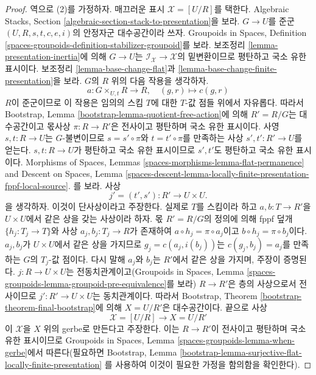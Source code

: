 \begin{proof}
\medskip\noindent
역으로 (2)를 가정하자. 매끄러운 표시 $\mathcal{X} = [U/R]$를 택한다.
Algebraic Stacks, Section
\ref{algebraic-section-stack-to-presentation}을 보라. $G \to U$를 준군
$(U, R, s, t, c, e, i)$의 안정자군 대수공간이라 쓰자. Groupoids in
Spaces, Definition \ref{spaces-groupoids-definition-stabilizer-groupoid}를
보라. 보조정리 \ref{lemma-presentation-inertia}에 의해 $G \to U$는
$\mathcal{I}_\mathcal{X} \to \mathcal{X}$의 밑변환이므로 평탄하고 국소
유한 표시이다. 보조정리 \ref{lemma-base-change-flat}과
\ref{lemma-base-change-finite-presentation}을 보라. $G$의 $R$ 위의 다음
작용을 생각하자.
$$
a : G \times_{U, t} R \to R, \quad (g, r) \mapsto c(g, r)
$$
$R$이 준군이므로 이 작용은 임의의 스킴 $T$에 대한 $T$-값 점들 위에서
자유롭다. 따라서 Bootstrap, Lemma
\ref{bootstrap-lemma-quotient-free-action}에 의해 $R' = R/G$는
대수공간이고 몫사상 $\pi : R \to R'$은 전사이고 평탄하며 국소 유한
표시이다. 사영 $s, t : R \to U$는 $G$-불변이므로
$s = s' \circ \pi$와 $t = t' \circ \pi$를 만족하는 사상
$s' , t' : R' \to U$를 얻는다. $s, t : R \to U$가 평탄하고 국소 유한
표시이므로 $s', t'$도 평탄하고 국소 유한 표시이다. Morphisms of Spaces,
Lemmas
\ref{spaces-morphisms-lemma-flat-permanence} and
Descent on Spaces, Lemma
\ref{spaces-descent-lemma-locally-finite-presentation-fppf-local-source}.
를 보라. 사상
$$
j' = (t', s') : R' \longrightarrow U \times U.
$$
을 생각하자. 이것이 단사상이라고 주장한다. 실제로 $T$를 스킴이라 하고
$a, b : T \to R'$을 $U \times U$에서 같은 상을 갖는 사상이라 하자.
몫 $R' = R/G$의 정의에 의해 fppf 덮개 $\{h_j : T_j \to T\}$와 사상
$a_j, b_j : T_j \to R$가 존재하여
$a \circ h_j = \pi \circ a_j$이고 $b \circ h_j = \pi \circ b_j$이다.
$a_j, b_j$가 $U \times U$에서 같은 상을 가지므로
$g_j = c(a_j, i(b_j))$는 $c(g_j, b_j) = a_j$를 만족하는 $G$의
$T_j$-값 점이다. 다시 말해 $a_j$와 $b_j$는 $R'$에서 같은 상을 가지며,
주장이 증명된다. $j : R \to U \times U$는 전동치관계이고(Groupoids in
Spaces, Lemma \ref{spaces-groupoids-lemma-groupoid-pre-equivalence}를 보라)
$R \to R'$은 층의 사상으로서 전사이므로
$j' : R' \to U \times U$는 동치관계이다. 따라서 Bootstrap, Theorem
\ref{bootstrap-theorem-final-bootstrap}에 의해 $X = U/R'$은
대수공간이다. 끝으로 사상
$$
\mathcal{X} = [U/R] \longrightarrow X = U/R'
$$
이 $\mathcal{X}$을 $X$ 위의 gerbe로 만든다고 주장한다. 이는
$R \to R'$이 전사이고 평탄하며 국소 유한 표시이므로 Groupoids in
Spaces, Lemma \ref{spaces-groupoids-lemma-when-gerbe}에서 따른다(필요하면
Bootstrap, Lemma
\ref{bootstrap-lemma-surjective-flat-locally-finite-presentation}
를 사용하여 이것이 필요한 가정을 함의함을 확인한다).
\end{proof}

